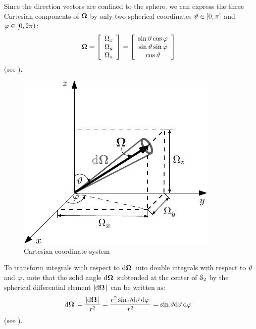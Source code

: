 Since the direction vectors are confined to the sphere, we can express the three
Cartesian components of $\mathbf{\Omega}$ by only two spherical coordinates $\vartheta\in[0,\pi]$ and
$\varphi\in[0,2\pi)$:
\begin{equation*}
	\mathbf{\Omega} = \left[\begin{array}{c}
		\Omega_x \\
		\Omega_y \\
		\Omega_z
	\end{array}\right] = \left[\begin{array}{c}
		\sin \vartheta\cos \varphi \\
		\sin \vartheta\sin \varphi \\
		\cos \vartheta
	\end{array}\right]
\end{equation*}
(see ).
\begin{figure}[!hbt]
    \centering
    \includegraphics[scale=1.275]{cartesian_streaming}
    \caption[Cartesian coordinate system]{Cartesian coordinate system}
    \label{fig:streaming}
\end{figure}
To transform integrals with respect to $\text{d}\mathbf{\Omega}\,$ into double integrals with respect to $\vartheta$ and $\varphi$,
note that the solid angle $\text{d}\mathbf{\Omega}\,$ subtended at the center of $\mathcal{S}_2$ by the spherical differential element
$\left\vert \text{d}\mathbf{\Omega}\, \right\vert$ can be written as:
$$
	\text{d}\mathbf{\Omega}\, = \frac{\left\vert \text{d}\mathbf{\Omega}\, \right\vert}{r^2} = \frac{r^2 \sin \vartheta \text{d}\vartheta\,\text{d}\varphi\,}{r^2} =  \sin \vartheta
	\text{d}\vartheta\,\text{d}\varphi\, $$
(see ).
